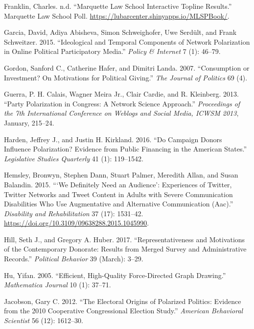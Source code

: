 \documentclass[12pt,]{article}
\begin{document}
\leavevmode\hypertarget{ref-mlsp}{}%
Franklin, Charles. n.d. ``Marquette Law School Interactive Topline
Results.'' Marquette Law School Poll.
\url{https://lubarcenter.shinyapps.io/MLSPBook/}.

\leavevmode\hypertarget{ref-garcia2015}{}%
Garcia, David, Adiya Abisheva, Simon Schweighofer, Uwe Serdült, and
Frank Schweitzer. 2015. ``Ideological and Temporal Components of Network
Polarization in Online Political Participatory Media.'' \emph{Policy \&
Internet} 7 (1): 46--79.

\leavevmode\hypertarget{ref-gordon2007}{}%
Gordon, Sanford C., Catherine Hafer, and Dimitri Landa. 2007.
``Consumption or Investment? On Motivations for Political Giving.''
\emph{The Journal of Politics} 69 (4).

\leavevmode\hypertarget{ref-guerra2013}{}%
Guerra, P. H. Calais, Wagner Meira Jr., Clair Cardie, and R. Kleinberg.
2013. ``Party Polarization in Congress: A Network Science Approach.''
\emph{Proceedings of the 7th International Conference on Weblogs and
Social Media, ICWSM 2013}, January, 215--24.

\leavevmode\hypertarget{ref-harden2016}{}%
Harden, Jeffrey J., and Justin H. Kirkland. 2016. ``Do Campaign Donors
Influence Polarization? Evidence from Public Financing in the American
States.'' \emph{Legislative Studies Quarterly} 41 (1): 119--1542.

\leavevmode\hypertarget{ref-hemsley2015}{}%
Hemsley, Bronwyn, Stephen Dann, Stuart Palmer, Meredith Allan, and Susan
Balandin. 2015. ```We Definitely Need an Audience': Experiences of
Twitter, Twitter Networks and Tweet Content in Adults with Severe
Communication Disabilities Who Use Augmentative and Alternative
Communication (Aac).'' \emph{Disability and Rehabilitation} 37 (17):
1531--42. \url{https://doi.org/10.3109/09638288.2015.1045990}.

\leavevmode\hypertarget{ref-hill2017}{}%
Hill, Seth J., and Gregory A. Huber. 2017. ``Representativeness and
Motivations of the Contemporary Donorate: Results from Merged Survey and
Administrative Records.'' \emph{Political Behavior} 39 (March): 3--29.

\leavevmode\hypertarget{ref-yifanhu}{}%
Hu, Yifan. 2005. ``Efficient, High-Quality Force-Directed Graph
Drawing.'' \emph{Mathematica Journal} 10 (1): 37--71.

\leavevmode\hypertarget{ref-jacobson2012}{}%
Jacobson, Gary C. 2012. ``The Electoral Origins of Polarized Politics:
Evidence from the 2010 Cooperative Congressional Election Study.''
\emph{American Behavioral Scientist} 56 (12): 1612--30.
\end{document}
